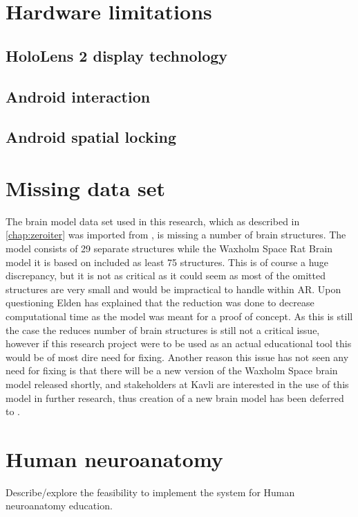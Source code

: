 \section{Hardware limitations}

\subsection*{HoloLens 2 display technology}

\subsection*{Android interaction}

\subsection*{Android spatial locking}

\section{Missing data set}
The brain model data set used in this research, which as described in \autoref{chap:zeroiter} was imported from , is missing a number of brain structures. The model consists of 29 separate structures while the Waxholm Space Rat Brain model it is based on included as least 75 structures. This is of course a huge discrepancy, but it is not as critical as it could seem as most of the omitted structures are very small and would be impractical to handle within AR. Upon questioning Elden has explained that the reduction was done to decrease computational time as the model was meant for a proof of concept. As this is still the case the reduces number of brain structures is still not a critical issue, however if this research project were to be used as an actual educational tool this would be of most dire need for fixing. Another reason this issue has not seen any need for fixing is that there will be a new version of the Waxholm Space brain model released shortly, and stakeholders at Kavli are interested in the use of this model in further research, thus creation of a new brain model has been deferred to .

\section{Human neuroanatomy}
Describe/explore the feasibility to implement the system for Human neuroanatomy education.

